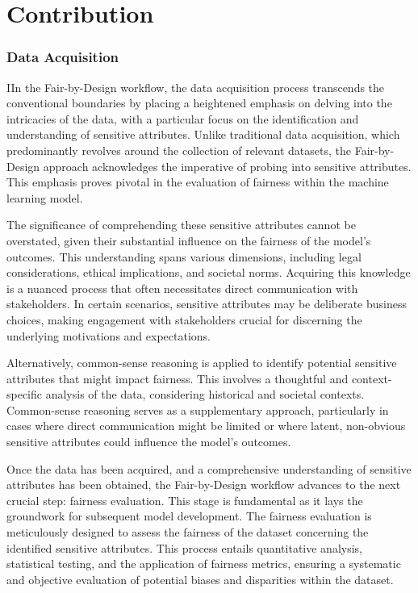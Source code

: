 \chapter{Contribution} %
\label{chap:contribution}

\subsection{Data Acquisition}

IIn the Fair-by-Design workflow, the data acquisition process transcends the conventional boundaries by placing a heightened emphasis on delving into the intricacies of the data, with a particular focus on the identification and understanding of sensitive attributes. Unlike traditional data acquisition, which predominantly revolves around the collection of relevant datasets, the Fair-by-Design approach acknowledges the imperative of probing into sensitive attributes. This emphasis proves pivotal in the evaluation of fairness within the machine learning model.

The significance of comprehending these sensitive attributes cannot be overstated, given their substantial influence on the fairness of the model's outcomes. This understanding spans various dimensions, including legal considerations, ethical implications, and societal norms. Acquiring this knowledge is a nuanced process that often necessitates direct communication with stakeholders. In certain scenarios, sensitive attributes may be deliberate business choices, making engagement with stakeholders crucial for discerning the underlying motivations and expectations.

Alternatively, common-sense reasoning is applied to identify potential sensitive attributes that might impact fairness. This involves a thoughtful and context-specific analysis of the data, considering historical and societal contexts. Common-sense reasoning serves as a supplementary approach, particularly in cases where direct communication might be limited or where latent, non-obvious sensitive attributes could influence the model's outcomes.

Once the data has been acquired, and a comprehensive understanding of sensitive attributes has been obtained, the Fair-by-Design workflow advances to the next crucial step: fairness evaluation. This stage is fundamental as it lays the groundwork for subsequent model development. The fairness evaluation is meticulously designed to assess the fairness of the dataset concerning the identified sensitive attributes. This process entails quantitative analysis, statistical testing, and the application of fairness metrics, ensuring a systematic and objective evaluation of potential biases and disparities within the dataset.

